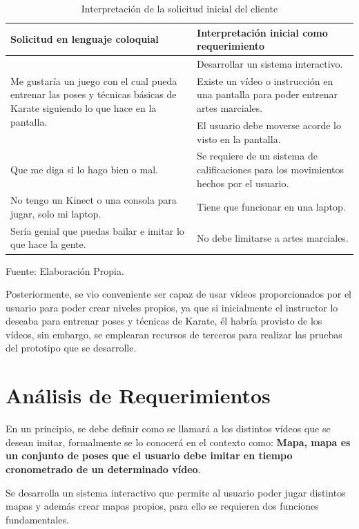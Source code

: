 \begin{table}[t]
	\begin{center}
		\begin{tabular}{|m{7cm}|m{8cm}|}
			\hline Solicitud en lenguaje coloquial & Interpretación inicial como requerimiento \\ \hline
			\multirow{3}{7cm}{Me gustaría un juego con el cual pueda entrenar las poses y técnicas básicas de Karate siguiendo lo que hace en la pantalla.}
			& Desarrollar un sistema interactivo.\\ 
			& Existe un vídeo o instrucción en una pantalla para poder entrenar artes marciales.\\ & El usuario debe moverse acorde lo visto en la pantalla. \\ \hline
			Que me diga si lo hago bien o mal. & Se requiere de un sistema de calificaciones para los movimientos hechos por el usuario. \\ \hline
			No tengo un Kinect o una consola para jugar, solo mi laptop. & Tiene que funcionar en una laptop. \\ \hline
			Sería genial que puedas bailar e imitar lo que hace la gente. & No debe limitarse a artes marciales. \\ \hline
		\end{tabular}
		\caption{Interpretación de la solicitud inicial del cliente}
		\label{requerimientos}
		\footnotesize Fuente: Elaboración Propia.
	\end{center}
\end{table}

Posteriormente, se vio conveniente ser capaz de usar vídeos proporcionados por el usuario para poder crear niveles propios, ya que si inicialmente el instructor lo deseaba para entrenar poses y técnicas de Karate, él habría provisto de los vídeos, sin embargo, se emplearan recursos de terceros para realizar las pruebas del prototipo que se desarrolle.

\section{Análisis de Requerimientos}

En un principio, se debe definir como se llamará a los distintos vídeos que se desean imitar, formalmente se lo conocerá en el contexto como: \textbf{Mapa, mapa es un conjunto de poses que el usuario debe imitar en tiempo cronometrado de un determinado vídeo}. 

Se desarrolla un sistema interactivo que permite al usuario poder jugar distintos mapas y además crear mapas propios, para ello se requieren dos funciones fundamentales.

